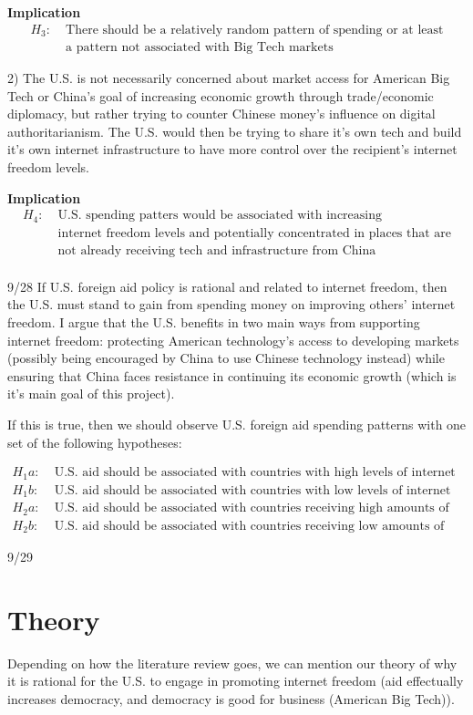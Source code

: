 \textbf{Implication}
\begin{align*}
    H_3:\; & \text{There should be a relatively random pattern of spending or at least}\\
    & \text{a pattern not associated with Big Tech markets}
\end{align*}

2) The U.S. is not necessarily concerned about market access for American Big Tech or China's goal of increasing economic growth through trade/economic diplomacy, but rather trying to counter Chinese money's influence on digital authoritarianism. The U.S. would then be trying to share it's own tech and build it's own internet infrastructure to have more control over the recipient's internet freedom levels.

\textbf{Implication}
\begin{align*}
    H_4:\; & \text{U.S. spending patters would be associated with increasing}\\
    & \text{internet freedom levels and potentially concentrated in places that are}\\
    & \text{not already receiving tech and infrastructure from China}\\
\end{align*}

9/28
If U.S. foreign aid policy is rational and related to internet freedom, then the U.S. must stand to gain from spending money on improving others' internet freedom. I argue that the U.S. benefits in two main ways from supporting internet freedom: protecting American technology's access to developing markets (possibly being encouraged by China to use Chinese technology instead) while ensuring that China faces resistance in continuing its economic growth (which is it's main goal of this project).

If this is true, then we should observe U.S. foreign aid spending patterns with one set of the following hypotheses:

\begin{align*}
    H_1a:\; & \text{U.S. aid should be associated with countries with high levels of internet freedom.}\\
    H_1b:\; & \text{U.S. aid should be associated with countries with low levels of internet freedom.}\\
    H_2a:\; & \text{U.S. aid should be associated with countries receiving high amounts of Chinese aid.}\\
    H_2b:\; & \text{U.S. aid should be associated with countries receiving low amounts of Chinese aid.}
\end{align*}

9/29
\section*{Theory}
Depending on how the literature review goes, we can mention our theory of why it is rational for the U.S. to engage in promoting internet freedom (aid effectually increases democracy, and democracy is good for business (American Big Tech)).

